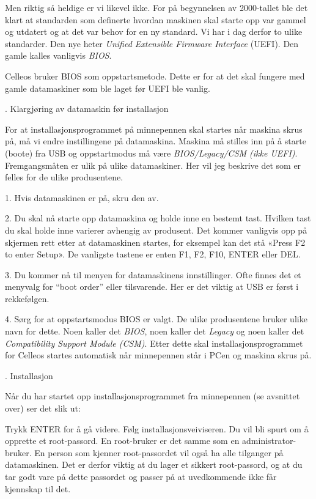 Men riktig s\aa{} heldige er vi likevel ikke. For p\aa{} begynnelsen av 2000-tallet ble det klart at standarden som definerte hvordan maskinen skal starte opp var gammel og utdatert og at det var behov for en ny standard. Vi har i dag derfor to ulike standarder. Den nye heter {\it Unified Extensible Firmware Interface} (UEFI). Den gamle kalles vanligvis {\it BIOS}. 

Celleos bruker BIOS som oppstartsmetode. Dette er for at det skal fungere med gamle datamaskiner som ble laget f\o r UEFI ble vanlig. 

. Klargj\o ring av datamaskin f\o r installasjon

For at installasjonsprogrammet p\aa{} minnepennen skal startes n\aa r maskina skrus p\aa , m\aa{} vi endre instillingene p\aa{} datamaskina. Maskina m\aa{} stilles inn p\aa{} \aa{} starte (boote) fra USB og oppstartmodus m\aa{} v\ae re {\it BIOS/Legacy/CSM (ikke UEFI)}. Fremgangsm\aa ten er ulik p\aa{} ulike datamaskiner. Her vil jeg beskrive det som er felles for de ulike produsentene. 
\item{1.} Hvis datamaskinen er p\aa, skru den av.
\item{2.} Du skal n\aa{} starte opp datamaskina og holde inne en bestemt tast. Hvilken tast du skal holde inne varierer avhengig av produsent. Det kommer vanligvis opp p\aa{} skjermen rett etter at datamaskinen startes, for eksempel kan det st\aa{} «Press F2 to enter Setup». De vanligste tastene er enten F1, F2, F10, ENTER eller DEL.
\item{3.} Du kommer n\aa{} til menyen for datamaskinens innstillinger. Ofte finnes det et menyvalg for ``boot order'' eller tilsvarende. Her er det viktig at USB er f\o rst i rekkef\o lgen.
\item{4.} S\o rg for at oppstartsmodus BIOS er valgt. De ulike produsentene bruker ulike navn for dette. Noen kaller det {\it BIOS}, noen kaller det {\it Legacy} og noen kaller det {\it Compatibility Support Module (CSM)}. 
Etter dette skal installasjonsprogrammet for Celleos startes automatisk n\aa r minnepennen st\aa r i PCen og maskina skrus p\aa.


. Installasjon

N\aa r du har startet opp installasjonsprogrammet fra minnepennen (se avsnittet over) ser det slik ut:

\centerline{
\epsfxsize 9cm
}

Trykk ENTER for \aa{} g\aa{} videre.
F\o lg installasjonsveiviseren. Du vil bli spurt om \aa{} opprette et root-passord. En root-bruker er det samme som en administrator-bruker. En person som kjenner root-passordet vil ogs\aa{} ha alle tilganger p\aa{} datamaskinen. Det er derfor viktig at du lager et sikkert root-passord, og at du tar godt vare p\aa{} dette passordet og passer p\aa{} at uvedkommende ikke f\aa r kjennskap til det. 

